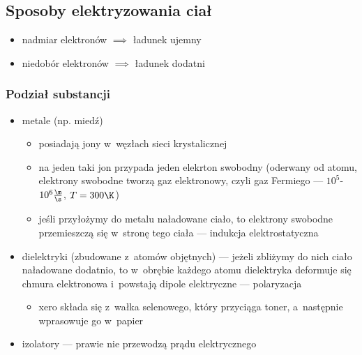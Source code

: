 \subsection*{Sposoby elektryzowania ciał}
\begin{itemize}
    \item nadmiar elektronów \(\implies\) ładunek ujemny
    \item niedobór elektronów \(\implies\) ładunek dodatni
\end{itemize}
\subsubsection*{Podział substancji}
\begin{itemize}
    \item metale (np. miedź)
        \begin{itemize}
            \item posiadają jony w~węzłach sieci krystalicznej
            \item na jeden taki jon przypada jeden elekrton swobodny (oderwany od atomu, elektrony swobodne tworzą gaz elektronowy, czyli gaz Fermiego --- \(10^5\)-\(10^6\frac{\m}{\s}\), \(T = 300\K\))
            \item jeśli przyłożymy do metalu naładowane ciało, to elektrony swobodne przemieszczą się w~stronę tego ciała --- indukcja elektrostatyczna
        \end{itemize}
    \item dielektryki (zbudowane z~atomów objętnych) --- jeżeli zbliżymy do nich ciało naładowane dodatnio, to w~obrębie każdego atomu dielektryka deformuje się chmura elektronowa i~powstają dipole elektryczne --- polaryzacja
        \begin{itemize}
            \item xero składa się z~wałka selenowego, który przyciąga toner, a~następnie wprasowuje go w~papier
        \end{itemize}
    \item izolatory --- prawie nie przewodzą prądu elektrycznego
\end{itemize}
